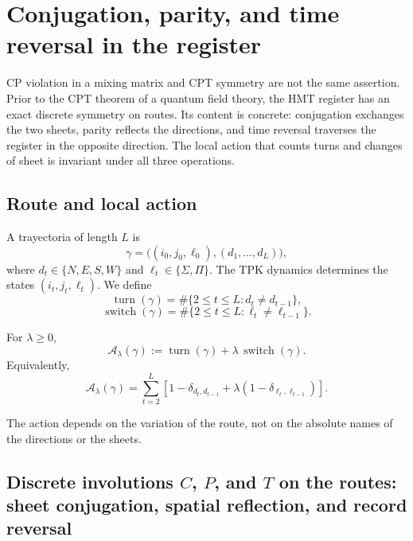 \chapter{Conjugation, parity, and time reversal in the register}
\label{chap:cpt-discreto-rutas-rev6}

CP violation in a mixing matrix and CPT symmetry are not the same
assertion. Prior to the CPT theorem of a quantum field theory, the HMT
register has an exact discrete symmetry on routes. Its content is concrete:
conjugation exchanges the two sheets, parity reflects the directions, and
time reversal traverses the register in the opposite direction. The local action
that counts turns and changes of sheet is invariant under all three operations.

\section{Route and local action}

A trayectoria of length \(L\) is
\[
 \gamma=
 \bigl((i_0,j_0,\ell_0),(d_1,\ldots,d_L)\bigr),
\]
where \(d_t\in\{N,E,S,W\}\) and
\(\ell_t\in\{\Sigma,\Pi\}\). The TPK dynamics determines the states
\((i_t,j_t,\ell_t)\). We define
\[
 \operatorname{turn}(\gamma)
 =
 \#\{2\leq t\leq L:d_t\neq d_{t-1}\},
\]
\[
 \operatorname{switch}(\gamma)
 =
 \#\{2\leq t\leq L:\ell_t\neq\ell_{t-1}\}.
\]

\begin{definition}
\label{def:accion-minima-cpt-rev6}
For \(\lambda\geq0\),
\[
 \mathcal A_\lambda(\gamma)
 :=
 \operatorname{turn}(\gamma)
 +\lambda\,\operatorname{switch}(\gamma).
\]
Equivalently,
\[
 \mathcal A_\lambda(\gamma)
 =
 \sum_{t=2}^{L}
 \left[
 1-\delta_{d_t,d_{t-1}}
 +\lambda(1-\delta_{\ell_t,\ell_{t-1}})
 \right].
\]
\end{definition}

The action depends on the variation of the route, not on the absolute names of
the directions or the sheets.

\section{Discrete involutions \(C\), \(P\), and \(T\) on the routes: sheet conjugation, spatial reflection, and record reversal}

